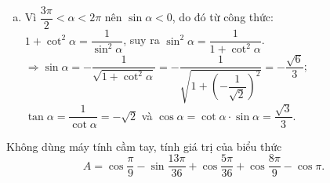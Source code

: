 \begin{bt}
{\begin{enumerate}[a)]
			$\Rightarrow\cos\alpha=-\dfrac{1}{\sqrt{1+\tan^2\alpha}}=-\dfrac{1}{\sqrt{1+(\sqrt{5})^2}}=-\dfrac{\sqrt{6}}{6}$;\\ $\cot\alpha=\dfrac{1}{\tan\alpha}=\dfrac{\sqrt{5}}{5}$ và $\sin\alpha=\tan\alpha\cdot\cos\alpha=-\dfrac{\sqrt{30}}{6}$.
			\item 
			Vì $\dfrac{3\pi}{2}<\alpha<2\pi$ nên $\sin\alpha<0$, do đó từ công thức:\\
			$1+\cot^2\alpha=\dfrac{1}{\sin^2\alpha}$, suy ra $\sin^2\alpha=\dfrac{1}{1+\cot^2\alpha}$.\\
			$\Rightarrow\sin\alpha=-\dfrac{1}{\sqrt{1+\cot^2\alpha}}=-\dfrac{1}{\sqrt{1+\left(-\dfrac{1}{\sqrt{2}}\right)^2}}=-\dfrac{\sqrt{6}}{3}$;\\ $\tan\alpha=\dfrac{1}{\cot\alpha}=-\sqrt{2}$ và $\cos\alpha=\cot\alpha\cdot\sin\alpha=\dfrac{\sqrt{3}}{3}$.
		\end{enumerate}
	}
\end{bt}

\begin{bt}%
	Không dùng máy tính cầm tay, tính giá trị của biểu thức
	\[A=\cos \dfrac{\pi}{9}-\sin \dfrac{13\pi}{36}+\cos \dfrac{5\pi}{36}+\cos \dfrac{8\pi}{9}-\cos \pi.\]
\end{bt}

